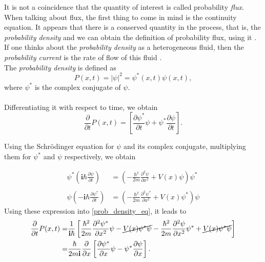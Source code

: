 \documentclass[12pt,a4paper,onecolumn]{article}
\theoremstyle{definition}
\theoremstyle{plain}
\begin{document}
It is not a coincidence that the quantity of interest is called probability \textit{flux}. When talking about flux, the first thing to come in mind is the continuity equation. It appears that there is a conserved quantity in the process, that is, the \textit{probability density} and we can obtain the definition of probability flux, using it \cite{ConservationLaw}. If one thinks about the \textit{probability density} as a heterogeneous fluid, then the \textit{probability current} is the rate of flow of this fluid \cite{wikiProbCurrent}. \\
The \textit{probability density} is defined as
    \begin{equation*}
    P(x,t) = |\psi|^2=\psi^{*}(x,t) \psi(x,t),
    \end{equation*}
    where $\psi^{*}$ is the complex conjugate of $\psi$.\\ \\
    Differentiating it with respect to time, we obtain
    \begin{equation} \label{prob_density_eq}
    \frac{\partial}{\partial t} P(x,t) =
    \left[\frac{\partial \psi^{*}}{\partial  t} \psi +
    \psi^{*} \frac{\partial \psi}{\partial  t} 
    \right].
    \end{equation}
    
 Using the Schrödinger equation for $\psi$ and its complex conjugate, multiplying them for $\psi^{*}$ and $\psi$ respectively, we obtain

\begin{align*}
        \psi^{*}\left(\textbf{i} \hbar \frac{\partial \psi}{\partial t}\right) &= \left(-\frac{\hbar^2}{2m} \frac{\partial^2 \psi}{\partial x^2} + V(x)\psi\right)\psi^{*}\\ \\
        \psi \left(-\textbf{i} \hbar \frac{\partial \psi^{*}}{\partial t}\right) &= \left(-\frac{\hbar^2}{2m} \frac{\partial^2 \psi^{*}}{\partial x^2} + V(x)\psi^{*}\right)\psi
    \end{align*}
  Using these expression into \eqref{prob_density_eq}, it leads to
    \begin{align*}
            \frac{\partial}{\partial t} P(x,t)= &
            \frac{1}{\textbf{i} \hbar}\left[
    \frac{\hbar^2}{2m} \frac{\partial^2 \psi^{*}}{\partial x^2} \psi - \cancel {V(x) \psi^{*}\psi} - 
    \frac{\hbar^2}{2m} \frac{\partial^2 \psi}{\partial x^2} \psi^{*} + 
    \cancel{V(x) \psi^{*} \psi}
    \right] \\
    =&\frac{\hbar}{2m\textbf{i}} \frac{\partial}{\partial x}
    \left[
    \frac{\partial \psi^{*}}{\partial  x} \psi -
    \psi^{*} \frac{\partial \psi}{\partial  x} 
    \right].
    \end{align*}
    
\end{document}
